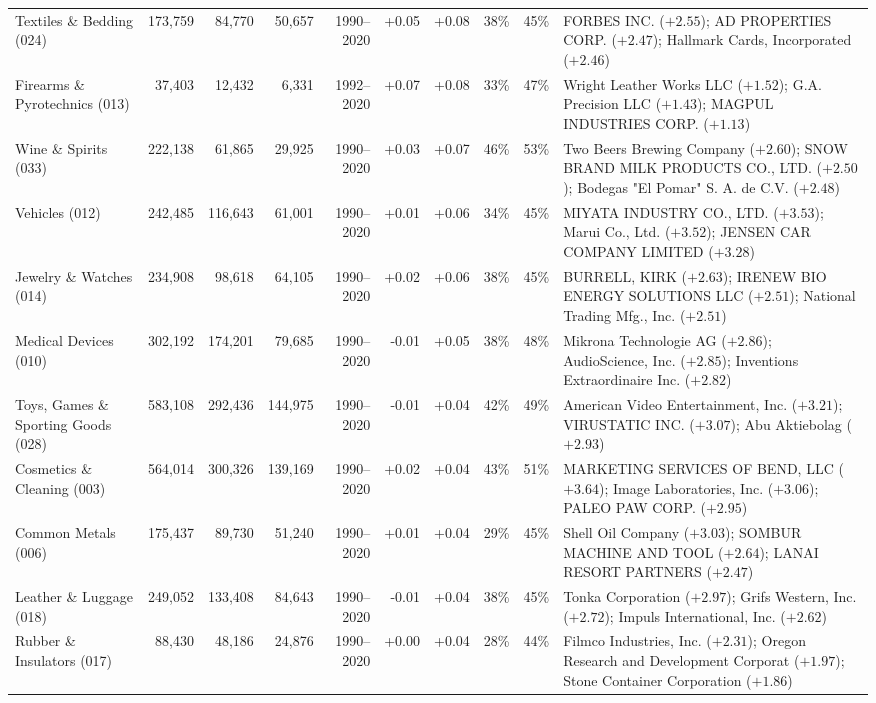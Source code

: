 {\begin{tabular}{l rrrr rr rr >{\raggedright\arraybackslash}p{8.5cm}}
Textiles \& Bedding (024) & 173,759 & 84,770 & 50,657 & 1990--2020 & +0.05 & +0.08 & 38\% & 45\% & FORBES INC. ($+2.55$); AD PROPERTIES CORP. ($+2.47$); Hallmark Cards, Incorporated ($+2.46$) \\
Firearms \& Pyrotechnics (013) & 37,403 & 12,432 & 6,331 & 1992--2020 & +0.07 & +0.08 & 33\% & 47\% & Wright Leather Works LLC ($+1.52$); G.A. Precision LLC ($+1.43$); MAGPUL INDUSTRIES CORP. ($+1.13$) \\
Wine \& Spirits (033) & 222,138 & 61,865 & 29,925 & 1990--2020 & +0.03 & +0.07 & 46\% & 53\% & Two Beers Brewing Company ($+2.60$); SNOW BRAND MILK PRODUCTS CO., LTD. ($+2.50$); Bodegas "El Pomar" S. A. de C.V. ($+2.48$) \\
Vehicles (012) & 242,485 & 116,643 & 61,001 & 1990--2020 & +0.01 & +0.06 & 34\% & 45\% & MIYATA INDUSTRY CO., LTD. ($+3.53$); Marui Co., Ltd. ($+3.52$); JENSEN CAR COMPANY LIMITED ($+3.28$) \\
Jewelry \& Watches (014) & 234,908 & 98,618 & 64,105 & 1990--2020 & +0.02 & +0.06 & 38\% & 45\% & BURRELL, KIRK ($+2.63$); IRENEW BIO ENERGY SOLUTIONS LLC ($+2.51$); National Trading Mfg., Inc. ($+2.51$) \\
Medical Devices (010) & 302,192 & 174,201 & 79,685 & 1990--2020 & -0.01 & +0.05 & 38\% & 48\% & Mikrona Technologie AG ($+2.86$); AudioScience, Inc. ($+2.85$); Inventions Extraordinaire Inc. ($+2.82$) \\
Toys, Games \& Sporting Goods (028) & 583,108 & 292,436 & 144,975 & 1990--2020 & -0.01 & +0.04 & 42\% & 49\% & American Video Entertainment, Inc. ($+3.21$); VIRUSTATIC INC. ($+3.07$); Abu Aktiebolag ($+2.93$) \\
Cosmetics \& Cleaning (003) & 564,014 & 300,326 & 139,169 & 1990--2020 & +0.02 & +0.04 & 43\% & 51\% & MARKETING SERVICES OF BEND, LLC ($+3.64$); Image Laboratories, Inc. ($+3.06$); PALEO PAW CORP. ($+2.95$) \\
Common Metals (006) & 175,437 & 89,730 & 51,240 & 1990--2020 & +0.01 & +0.04 & 29\% & 45\% & Shell Oil Company ($+3.03$); SOMBUR MACHINE AND TOOL ($+2.64$); LANAI RESORT PARTNERS ($+2.47$) \\
Leather \& Luggage (018) & 249,052 & 133,408 & 84,643 & 1990--2020 & -0.01 & +0.04 & 38\% & 45\% & Tonka Corporation ($+2.97$); Grifs Western, Inc. ($+2.72$); Impuls International, Inc. ($+2.62$) \\
Rubber \& Insulators (017) & 88,430 & 48,186 & 24,876 & 1990--2020 & +0.00 & +0.04 & 28\% & 44\% & Filmco Industries, Inc. ($+2.31$); Oregon Research and Development Corporat ($+1.97$); Stone Container Corporation ($+1.86$) \\

\end{tabular}}
